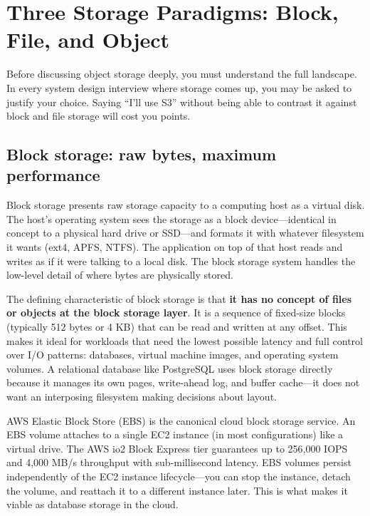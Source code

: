 \documentclass[11pt,a4paper]{article}
\begin{document}
\section{Three Storage Paradigms: Block, File, and Object}

Before discussing object storage deeply, you must understand the full landscape. In every system design interview where storage comes up, you may be asked to justify your choice. Saying ``I'll use S3'' without being able to contrast it against block and file storage will cost you points.

\subsection{Block storage: raw bytes, maximum performance}

Block storage presents raw storage capacity to a computing host as a virtual disk. The host's operating system sees the storage as a block device---identical in concept to a physical hard drive or SSD---and formats it with whatever filesystem it wants (ext4, APFS, NTFS). The application on top of that host reads and writes as if it were talking to a local disk. The block storage system handles the low-level detail of where bytes are physically stored.

The defining characteristic of block storage is that \textbf{it has no concept of files or objects at the block storage layer}. It is a sequence of fixed-size blocks (typically 512 bytes or 4 KB) that can be read and written at any offset. This makes it ideal for workloads that need the lowest possible latency and full control over I/O patterns: databases, virtual machine images, and operating system volumes. A relational database like PostgreSQL uses block storage directly because it manages its own pages, write-ahead log, and buffer cache---it does not want an interposing filesystem making decisions about layout.

AWS Elastic Block Store (EBS) is the canonical cloud block storage service. An EBS volume attaches to a single EC2 instance (in most configurations) like a virtual drive. The AWS io2 Block Express tier guarantees up to 256,000 IOPS and 4,000 MB/s throughput with sub-millisecond latency. EBS volumes persist independently of the EC2 instance lifecycle---you can stop the instance, detach the volume, and reattach it to a different instance later. This is what makes it viable as database storage in the cloud.
\end{document}
